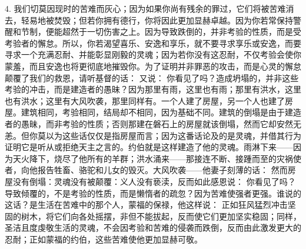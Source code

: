 4. 我们切莫因现时的苦难而灰心；因为如果你尚有残余的罪过，它们将被苦难消去，轻易地被焚毁；但若你拥有德行，你将因此更加显赫卓越。因为你若常保持警醒和节制，便能超然于一切伤害之上。因为导致跌倒的，并非考验的性质，而是受考验者的懈怠。所以，你若渴望喜乐、安逸和享乐，就不要寻求享乐或安逸，而要寻求一个充满忍耐、并能彰显刚毅的灵魂；因为若你没有这忍耐，不仅考验会使你蒙羞，而且安逸也将更彻底地摧毁你。为了证明并非罪恶的攻击，而是心灵的懈怠颠覆了我们的救恩，请听基督的话： 又说：  你看见了吗？造成坍塌的，并非这些考验的冲击，而是建造者的愚昧？因为那里有雨，这里也有雨；那里有洪水，这里也有洪水；这里有大风吹袭，那里同样有。一个人建了房屋，另一个人也建了房屋。建筑相同，考验相同，结局却不相同，因为基础不同。建筑的倒塌是由于建造者的愚昧，而非考验的性质；否则那建在磐石上的房屋就该倒塌，然而它却安然无恙。但你莫以为这些话仅仅是指房屋而言；因为这番话论及的是灵魂，并借其行为证明它是听从或拒绝天主之言的。约伯就是这样建造了他的灵魂。雨淋下来——因为天火降下，烧尽了他所有的羊群；洪水涌来——那接连不断、接踵而至的灾祸使者，向他报告牲畜、骆驼和儿女的毁灭。大风吹袭——他妻子刻薄的话：  然而房屋没有倒塌：灵魂没有被颠覆：义人没有亵渎，反而如此感恩说：  你看见了吗？导致倾覆的，不是考验的性质，而是懒惰者的疏忽？因为苦难使强者更强。谁说的这话？是生活在苦难中的那个人，蒙福的保禄，他这样说：  正如狂风猛烈冲击坚固的树木，将它们向各处摇摆，非但不能拔起，反而使它们更加坚实稳固；同样，圣洁且度虔敬生活的灵魂，不会因考验和苦难的侵袭而跌倒，反而由此激发更大的忍耐；正如蒙福的约伯，这些苦难使他更加显赫可敬。\par

